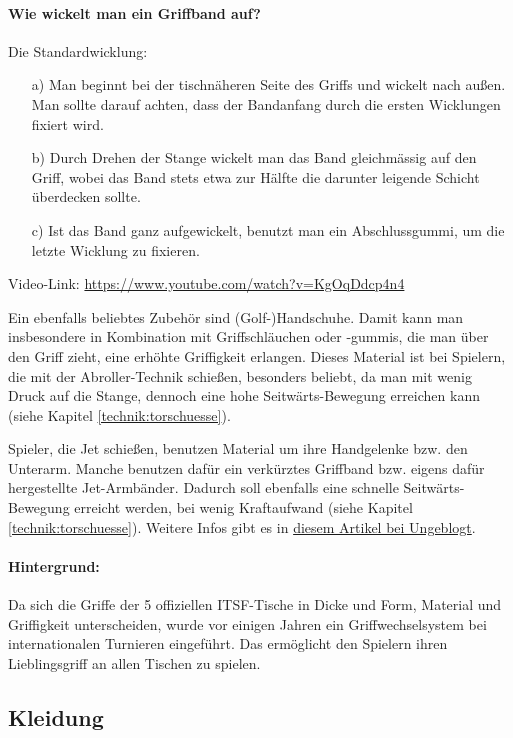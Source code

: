 \paragraph{Wie wickelt man ein Griffband auf?} Die Standardwicklung: 
\begin{itemize}
    \item[a)] Man beginnt bei der tischnäheren Seite des Griffs und wickelt nach außen.
        Man sollte darauf achten, dass der Bandanfang durch die ersten Wicklungen fixiert wird. 
    \item[b)] Durch Drehen der Stange wickelt man das Band gleichmässig auf den Griff, wobei das Band stets etwa zur Hälfte die darunter leigende Schicht überdecken sollte.
    \item[c)] Ist das Band ganz aufgewickelt, benutzt man ein Abschlussgummi, um die letzte Wicklung zu fixieren.
\end{itemize}
Video-Link: \url{https://www.youtube.com/watch?v=KgOqDdcp4n4}


Ein ebenfalls beliebtes Zubehör sind (Golf-)Handschuhe. 
Damit kann man insbesondere in Kombination mit Griffschläuchen oder -gummis, die man über den Griff zieht, eine erhöhte Griffigkeit erlangen.
Dieses Material ist bei Spielern, die mit der Abroller-Technik schießen, besonders beliebt, da man mit wenig Druck auf die Stange, dennoch eine hohe Seitwärts-Bewegung erreichen kann (siehe Kapitel \ref{technik:torschuesse}).  

Spieler, die Jet schießen, benutzen Material um ihre Handgelenke bzw. den Unterarm. 
Manche benutzen dafür ein verkürztes Griffband bzw. eigens dafür hergestellte Jet-Armbänder.
Dadurch soll ebenfalls eine schnelle Seitwärts-Bewegung erreicht werden, bei wenig Kraftaufwand (siehe Kapitel \ref{technik:torschuesse}).
Weitere Infos gibt es in \href{http://ungeblogtkickern.blogspot.de/2015/05/griffe-praparieren.html}{diesem Artikel bei Ungeblogt}.

\paragraph{Hintergrund:} Da sich die Griffe der 5 offiziellen ITSF-Tische in Dicke und Form, Material und Griffigkeit unterscheiden, wurde vor einigen Jahren ein Griffwechselsystem bei internationalen Turnieren eingeführt.
Das ermöglicht den Spielern ihren Lieblingsgriff an allen Tischen zu spielen. 


\subsection{Kleidung}
\label{tisch:zubehoer:kleidung}

